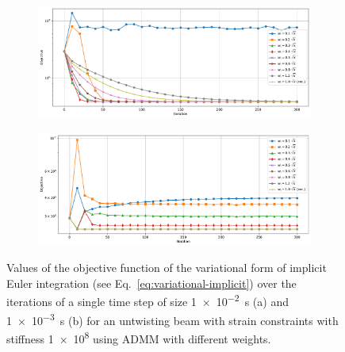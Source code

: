 \begin{figure}[h]
    \centering
    \begin{subfigure}{\textwidth}
        \includegraphics[width=\linewidth]{figures/strain_admm_weights_1e-2.pdf}
    \end{subfigure}
    \begin{subfigure}{\textwidth}
        \includegraphics[width=\linewidth]{figures/strain_admm_weights_1e-3.pdf}
    \end{subfigure}
    \caption{Values of the objective function of the variational form of implicit Euler integration (see Eq.\ \ref{eq:variational-implicit}) over the iterations of a single time 
        step of size \SI{1e-2}{\second} (a) and \SI{1e-3}{\second} (b) for an untwisting beam with strain constraints with stiffness \num{1e8} using ADMM with different weights.}
    \label{fig:strain-weights-admm}
\end{figure}


